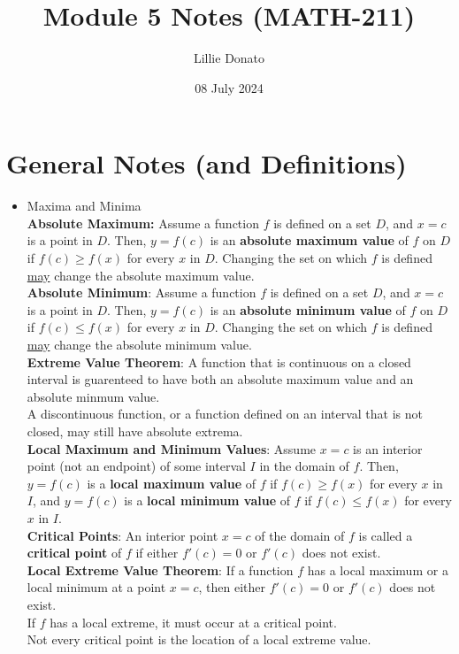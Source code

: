 \documentclass{article}
\title{Module 5 Notes (MATH-211)}
\author{Lillie Donato}
\date{08 July 2024}
\begin{document}
\maketitle

\section*{General Notes (and Definitions)}
\begin{itemize}
    \item Maxima and Minima \\
    \textbf{Absolute Maximum:} Assume a function $f$ is defined on a set $D$, and $x = c$ is a point in $D$. Then, $y = f(c)$ is an \textbf{absolute maximum value} of $f$ on $D$ if $f(c) \geq f(x)$ for every $x$ in $D$. Changing the set on which $f$ is defined \underline{may} change the absolute maximum value. \\
    \textbf{Absolute Minimum}: Assume a function $f$ is defined on a set $D$, and $x = c$ is a point in $D$. Then, $y = f(c)$ is an \textbf{absolute minimum value} of $f$ on $D$ if $f(c) \leq f(x)$ for every $x$ in $D$. Changing the set on which $f$ is defined \underline{may} change the absolute minimum value. \\
    \textbf{Extreme Value Theorem}: A function that is continuous on a closed interval is guarenteed to have both an absolute maximum value and an absolute minmum value. \\
    A discontinuous function, or a function defined on an interval that is not closed, may still have absolute extrema. \\
    \textbf{Local Maximum and Minimum Values}: Assume $x = c$ is an interior point (not an endpoint) of some interval $I$ in the domain of $f$. Then, $y = f(c)$ is a \textbf{local maximum value} of $f$ if $f(c) \geq f(x)$ for every $x$ in $I$, and $y = f(c)$ is a \textbf{local minimum value} of $f$ if $f(c) \leq f(x)$ for every $x$ in $I$. \\
    \textbf{Critical Points}: An interior point $x = c$ of the domain of $f$ is called a \textbf{critical point} of $f$ if either $f'(c) = 0$ or $f'(c)$ does not exist. \\
    \textbf{Local Extreme Value Theorem}: If a function $f$ has a local maximum or a local minimum at a point $x = c$, then either $f'(c) = 0$ or $f'(c)$ does not exist. \\
    If $f$ has a local extreme, it must occur at a critical point. \\
    Not every critical point is the location of a local extreme value. \\

\end{itemize}
\end{document}

